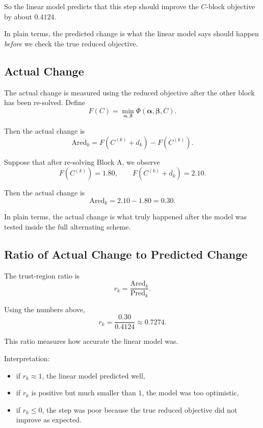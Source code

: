 \documentclass{article}
\begin{document}
So the linear model predicts that this step should improve the $C$-block objective by about $0.4124$.

In plain terms, the predicted change is what the linear model says should happen \emph{before} we check the true reduced objective.

\subsection{Actual Change}

The actual change is measured using the reduced objective after the other block has been re-solved. Define
\begin{equation}
 F(C) = \min_{\boldsymbol{\alpha},\boldsymbol{\beta}} \Phi(\boldsymbol{\alpha},\boldsymbol{\beta},C).
\end{equation}

Then the actual change is
\begin{equation}
 \mathrm{Ared}_k = F(C^{(k)} + d_k) - F(C^{(k)}).
\end{equation}

Suppose that after re-solving Block A, we observe
\begin{equation}
 F(C^{(k)}) = 1.80,
 \qquad
 F(C^{(k)} + d_k) = 2.10.
\end{equation}

Then the actual change is
\begin{equation}
 \mathrm{Ared}_k = 2.10 - 1.80 = 0.30.
\end{equation}

In plain terms, the actual change is what truly happened after the model was tested inside the full alternating scheme.

\subsection{Ratio of Actual Change to Predicted Change}

The trust-region ratio is
\begin{equation}
 r_k = \frac{\mathrm{Ared}_k}{\mathrm{Pred}_k}.
\end{equation}

Using the numbers above,
\begin{equation}
 r_k = \frac{0.30}{0.4124} \approx 0.7274.
\end{equation}

This ratio measures how accurate the linear model was.

Interpretation:
\begin{itemize}
    \item if $r_k \approx 1$, the linear model predicted well,
    \item if $r_k$ is positive but much smaller than $1$, the model was too optimistic,
    \item if $r_k \leq 0$, the step was poor because the true reduced objective did not improve as expected.
\end{itemize}
\end{document}
